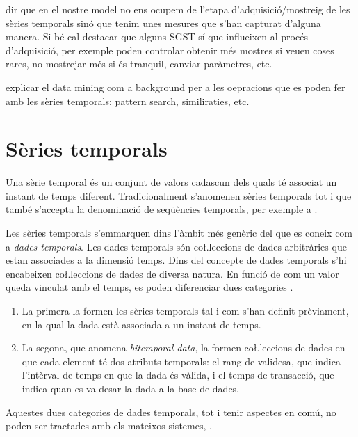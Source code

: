 dir que en el nostre model no ens ocupem de l'etapa d'adquisició/mostreig de les sèries temporals sinó que tenim unes mesures que s'han capturat d'alguna manera. Si bé cal destacar que alguns SGST sí que influeixen al procés d'adquisició, per exemple poden controlar obtenir més mostres si veuen coses rares, no mostrejar més si és tranquil, canviar paràmetres, etc.


\todo{}
explicar el data mining com a background per a les oepracions que es poden fer amb les sèries temporals: pattern search, similiraties, etc.

\section{Sèries temporals}





Una sèrie temporal és un conjunt de valors cadascun dels quals té
associat un instant de temps diferent.  Tradicionalment s'anomenen
sèries temporals tot i que també s'accepta la denominació de
seqüències temporals, per exemple a \cite{last:hetland}.

Les sèries temporals s'emmarquen dins l'àmbit més genèric del que es
coneix com a \emph{dades temporals}. Les dades temporals són
co\l.leccions de dades arbitràries que estan associades a la dimensió
temps.  Dins del concepte de dades temporals s'hi encabeixen
co\l.leccions de dades de diversa natura. En funció de com un valor
queda vinculat amb el temps, es poden diferenciar dues
categories \parencite{assfalg08:thesis}.
\begin{enumerate}
\item La primera la formen les sèries temporals tal i com s'han
  definit prèviament, en la qual la dada està associada a un instant
  de temps.
\item La segona, que anomena \emph{bitemporal data}, la formen
  co\l.leccions de dades en que cada element té dos atributs
  temporals: el rang de validesa, que indica l'intèrval de temps en
  que la dada és vàlida, i el temps de transacció, que indica quan es
  va desar la dada a la base de dades.  
\end{enumerate}
Aquestes dues categories de dades temporals, tot i tenir aspectes en
comú, no poden ser tractades amb els mateixos
sistemes, \parencite{schmidt95}.


